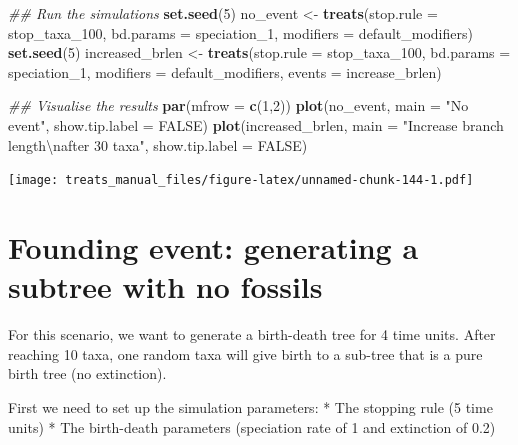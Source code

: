 \documentclass[
]{book}
\newenvironment{Shaded}{\begin{snugshade}}{\end{snugshade}}
\newcommand{\CharTok}[1]{\textcolor[rgb]{0.31,0.60,0.02}{#1}}
\newcommand{\CommentTok}[1]{\textcolor[rgb]{0.56,0.35,0.01}{\textit{#1}}}
\newcommand{\DataTypeTok}[1]{\textcolor[rgb]{0.13,0.29,0.53}{#1}}
\newcommand{\DecValTok}[1]{\textcolor[rgb]{0.00,0.00,0.81}{#1}}
\newcommand{\KeywordTok}[1]{\textcolor[rgb]{0.13,0.29,0.53}{\textbf{#1}}}
\newcommand{\NormalTok}[1]{#1}
\newcommand{\OtherTok}[1]{\textcolor[rgb]{0.56,0.35,0.01}{#1}}
\newcommand{\StringTok}[1]{\textcolor[rgb]{0.31,0.60,0.02}{#1}}
\begin{document}
\begin{Shaded}
\begin{Highlighting}[]
\CommentTok{\#\# Run the simulations}
\KeywordTok{set.seed}\NormalTok{(}\DecValTok{5}\NormalTok{)}
\NormalTok{no\_event \textless{}{-}}\StringTok{ }\KeywordTok{treats}\NormalTok{(}\DataTypeTok{stop.rule =}\NormalTok{ stop\_taxa\_}\DecValTok{100}\NormalTok{,}
                 \DataTypeTok{bd.params =}\NormalTok{ speciation\_}\DecValTok{1}\NormalTok{,}
                 \DataTypeTok{modifiers =}\NormalTok{ default\_modifiers)}
\KeywordTok{set.seed}\NormalTok{(}\DecValTok{5}\NormalTok{)}
\NormalTok{increased\_brlen \textless{}{-}}\StringTok{ }\KeywordTok{treats}\NormalTok{(}\DataTypeTok{stop.rule =}\NormalTok{ stop\_taxa\_}\DecValTok{100}\NormalTok{,}
                        \DataTypeTok{bd.params =}\NormalTok{ speciation\_}\DecValTok{1}\NormalTok{,}
                        \DataTypeTok{modifiers =}\NormalTok{ default\_modifiers,}
                        \DataTypeTok{events =}\NormalTok{ increase\_brlen)}

\CommentTok{\#\# Visualise the results}
\KeywordTok{par}\NormalTok{(}\DataTypeTok{mfrow =} \KeywordTok{c}\NormalTok{(}\DecValTok{1}\NormalTok{,}\DecValTok{2}\NormalTok{))}
\KeywordTok{plot}\NormalTok{(no\_event, }\DataTypeTok{main =} \StringTok{"No event"}\NormalTok{, }\DataTypeTok{show.tip.label =} \OtherTok{FALSE}\NormalTok{)}
\KeywordTok{plot}\NormalTok{(increased\_brlen, }\DataTypeTok{main =} \StringTok{"Increase branch length}\CharTok{\textbackslash{}n}\StringTok{after 30 taxa"}\NormalTok{,}
    \DataTypeTok{show.tip.label =} \OtherTok{FALSE}\NormalTok{)}
\end{Highlighting}
\end{Shaded}

\texttt{[image: treats\_manual\_files/figure-latex/unnamed-chunk-144-1.pdf]}

\hypertarget{EG_founding_purebirth}{%
\section{Founding event: generating a subtree with no fossils}\label{EG_founding_purebirth}}

For this scenario, we want to generate a birth-death tree for 4 time units.
After reaching 10 taxa, one random taxa will give birth to a sub-tree that is a pure birth tree (no extinction).

First we need to set up the simulation parameters:
* The stopping rule (5 time units)
* The birth-death parameters (speciation rate of 1 and extinction of 0.2)
\end{document}
